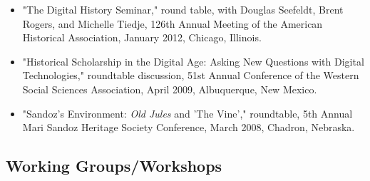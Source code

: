 \documentclass[10pt]{article}
\begin{document}
\begin{itemize}
  \item "The Digital History Seminar," round table, with Douglas Seefeldt, Brent Rogers, and Michelle Tiedje, 126th Annual Meeting of the American Historical Association, January 2012, Chicago, Illinois.
  
  \item "Historical Scholarship in the Digital Age: Asking New Questions with Digital Technologies," roundtable discussion, 51st Annual Conference of the Western Social Sciences Association, April 2009, Albuquerque, New Mexico.
  
  \item "Sandoz's Environment: \textit{Old Jules} and 'The Vine'," roundtable, 5th Annual Mari Sandoz Heritage Society Conference, March 2008, Chadron, Nebraska.
\end{itemize}

\subsection*{Working Groups/Workshops}
\end{document}
